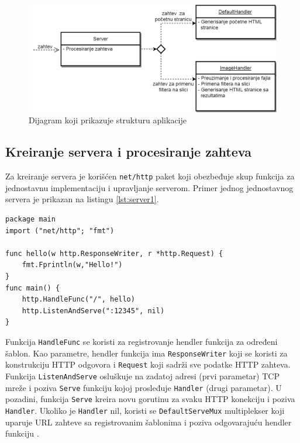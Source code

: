 \documentclass[12pt,oneside]{memoir}
\begin{document}
\begin{figure}
\begin{center}
\includegraphics[scale=0.45]{dijagram.png}
\end{center}
\caption{Dijagram koji prikazuje strukturu aplikacije}
\label{fig:diag}
\end{figure}

\subsection{Kreiranje servera i procesiranje zahteva}

Za kreiranje servera je korišćen \texttt{net/http} paket koji obezbeđuje skup funkcija za jednostavnu implementaciju i upravljanje serverom. Primer jednog jednostavnog servera je prikazan na listingu \ref{lst:server1}. 

\begin{center}
\begin{lstlisting}[caption=Primer jednostavnog servera,label={lst:server1},   backgroundcolor=\color{background}]
package main
import ("net/http"; "fmt")

func hello(w http.ResponseWriter, r *http.Request) {
	fmt.Fprintln(w,"Hello!")
}
func main() {
	http.HandleFunc("/", hello)
	http.ListenAndServe(":12345", nil)
}
\end{lstlisting}
\end{center}


Funkcija \texttt{HandleFunc} se koristi za registrovanje hendler funkcija za određeni šablon. Kao parametre, hendler funkcija ima \texttt{ResponseWriter} koji se koristi za konstrukciju HTTP odgovora i \texttt{Request} koji sadrži sve podatke HTTP zahteva. Funkcija \texttt{ListenAndServe} osluškuje na zadatoj adresi (prvi parametar) TCP mreže i poziva \texttt{Serve} funkciju kojoj prosleđuje \texttt{Handler} (drugi parametar). U pozadini, funkcija \texttt{Serve} kreira novu gorutinu za svaku HTTP konekciju i poziva \texttt{Handler}. Ukoliko je \texttt{Handler} nil, koristi se \texttt{DefaultServeMux} multiplekser koji uparuje URL zahteve sa registrovanim šablonima i poziva odgovarajuću hendler funkciju \cite{http}.
\end{document}
